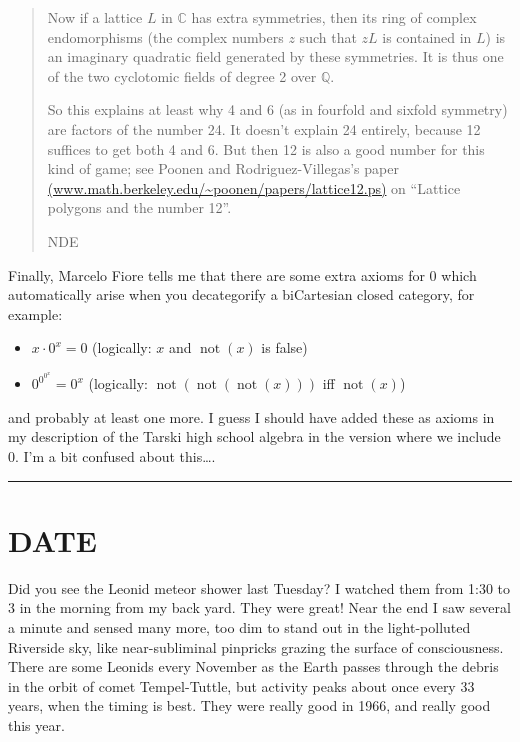 \documentclass{article}
\def\tightlist{}
\begin{document}
\begin{quote}
Now if a lattice \(L\) in \(\mathbb{C}\) has extra symmetries, then its
ring of complex endomorphisms (the complex numbers \(z\) such that
\(zL\) is contained in \(L\)) is an imaginary quadratic field generated
by these symmetries. It is thus one of the two cyclotomic fields of
degree 2 over \(\mathbb{Q}\).

So this explains at least why 4 and 6 (as in fourfold and sixfold
symmetry) are factors of the number 24. It doesn't explain 24 entirely,
because 12 suffices to get both 4 and 6. But then 12 is also a good
number for this kind of game; see Poonen and Rodriguez-Villegas's paper
\href{www.math.berkeley.edu/~poonen/papers/lattice12.ps}{(www.math.berkeley.edu/\textasciitilde poonen/papers/lattice12.ps)}
on ``Lattice polygons and the number 12''.

NDE
\end{quote}

Finally, Marcelo Fiore tells me that there are some extra axioms for
\(0\) which automatically arise when you decategorify a biCartesian
closed category, for example:

\begin{itemize}
\tightlist
\item
  \(x\cdot 0^x=0\) (logically: \(x\) and \(\operatorname{not}(x)\) is
  false)
\item
  \(0^{0^{0^x}}=0^x\) (logically:
  \(\operatorname{not}(\operatorname{not}(\operatorname{not}(x)))\) iff
  \(\operatorname{not}(x)\))
\end{itemize}

and probably at least one more. I guess I should have added these as
axioms in my description of the Tarski high school algebra in the
version where we include \(0\). I'm a bit confused about this\ldots.

\begin{center}\rule{0.5\linewidth}{0.5pt}\end{center}
\hypertarget{week173}{%
\section{DATE}\label{week173}}

Did you see the Leonid meteor shower last Tuesday? I watched them from
1:30 to 3 in the morning from my back yard. They were great! Near the
end I saw several a minute and sensed many more, too dim to stand out in
the light-polluted Riverside sky, like near-subliminal pinpricks grazing
the surface of consciousness. There are some Leonids every November as
the Earth passes through the debris in the orbit of comet Tempel-Tuttle,
but activity peaks about once every 33 years, when the timing is best.
They were really good in 1966, and really good this year.
\end{document}
